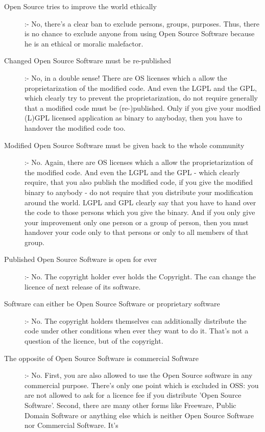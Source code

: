 \begin{description}
  \item[Open Source tries to improve the world ethically] :- No, there's a clear
  ban to exclude persons, groups, purposes. Thus, there is no chance to exclude
  anyone from using Open Source Software because he is an ethical or moralic
  malefactor.
  \item[Changed Open Source Software must be re-published] :- No, in a double
  sense! There are OS licenses which a allow the proprietarization of the
  modified code. And even the LGPL and the GPL, which clearly try to prevent
  the proprietarization, do not require generally that a modified code must be
  (re-)published. Only if you give your modfied (L)GPL licensed application as
  binary to anyboday, then you have to handover the modified code too.
  \item[Modified Open Source Software must be given back to the whole community]
  :- No. Again, there are OS licenses which a allow the proprietarization of the
  modified code. And even the LGPL and the GPL - which clearly require, that you
  also publish the modified code, if you give the modified binary to anybody -
  do not require that you distribute your modification around the world. LGPL and
  GPL clearly say that you have to hand over the code to those persons which you
  give the binary. And if you only give your improvement only one person or a
  group of person, then you must handover your code only to that persons or
  only to all members of that group.
  \item[Published Open Source Software is open for ever] :- No. The copyright
  holder ever holds the Copyright. The can change the licence of next release of
  its software.
  \item[Software can either be Open Source Software or proprietary software] :-
  No. The copyright holders themselves can additionally distribute the code
  under other conditions when ever they want to do it. That's not a question of
  the licence, but of the copyright.  
  \item[The opposite of Open Source Software is commercial Software] :- No.
  First, you are also allowed to use the Open Source software in any commercial
  purpose. There's only one point which is excluded in OSS: you are not allowed
  to ask for a licence fee if you distribute 'Open Source Software'. Second,
  there are many other forms like Freeware, Public Domain Software or anything
  else which is neither Open Source Software nor Commercial Software. It's

\end{description}
